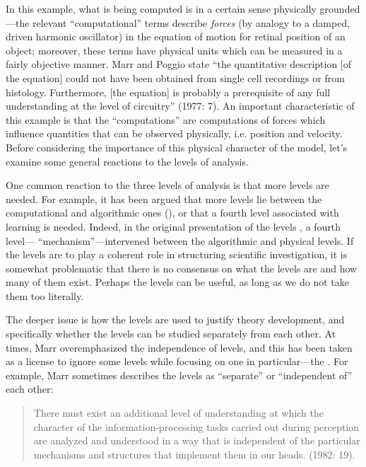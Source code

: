 In this example, what is being computed is in a certain sense physically grounded—the relevant “computational” terms describe \textit{forces} (by analogy to a damped, driven harmonic oscillator) in the equation of motion for retinal position of an object; moreover, these terms have physical units which can be measured in a fairly objective manner. Marr and Poggio state “the quantitative description [of the equation] could not have been obtained from single cell recordings or from histology. Furthermore, [the equation] is probably a prerequisite of any full understanding at the level of circuitry” (1977: 7). An important characteristic of this example is that the “computations” are computations of forces which influence quantities that can be observed physically, i.e. position and velocity. Before considering the importance of this physical character of the model, let's examine some general reactions to the levels of analysis.

One common reaction to the three levels of analysis is that more levels are needed. For example, it has been argued that more levels lie between the computational and algorithmic ones (\citealt{GriffithsEtAl2015,Pylyshyn1984}), or that a fourth level associated with learning is needed. Indeed, in the original presentation of the levels \citep{MarrPoggio1977}, a fourth level— “mechanism”—intervened between the algorithmic and physical levels. If the levels are to play a coherent role in structuring scientific investigation, it is somewhat problematic that there is no consensus on what the levels are and how many of them exist. Perhaps the levels can be useful, as long as we do not take them too literally.

The deeper issue is how the levels are used to justify theory development, and specifically whether the levels can be studied separately from each other. At times, Marr overemphasized the independence of levels, and this has been taken as a license to ignore some levels while focusing on one in particular—the . For example, Marr sometimes describes the levels as “separate” or “independent of” each other:

\begin{quote} 
There must exist an additional level of understanding at which the character of the information-processing tasks carried out during perception are analyzed and understood in a way that is independent of the particular mechanisms and structures that implement them in our heads. (1982: 19).
\end{quote}

